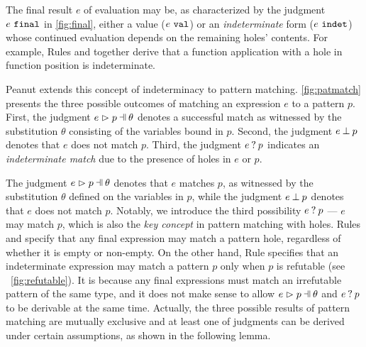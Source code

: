 The final result $e$ of evaluation may be, as characterized by the judgment $e ~\mathtt{final}$ in \autoref{fig:final}, either a value ($e ~\mathtt{val}$) or an \emph{indeterminate} form ($e ~\mathtt{indet}$) whose continued evaluation depends on the remaining holes' contents. For example, Rules \IAp and \IEHole together derive that a function application with a hole in function position is indeterminate.



Peanut extends this concept of indeterminacy to pattern matching.
\autoref{fig:patmatch} presents the three possible outcomes of matching an expression $e$ to a pattern $p$.
First, the judgment $\hpatmatch{e}{p}{\theta}$ denotes a successful match as witnessed by the substitution $\theta$ consisting of the variables bound in $p$. Second, the judgment $e \mathbin{\bot} p$ denotes that $e$ does not match $p$. Third, the judgment $e \mathbin{?} p$ indicates an \emph{indeterminate match} due to the presence of holes in $e$ or $p$.






The judgment $\hpatmatch{e}{p}{\theta}$ denotes that $e$ matches $p$, as witnessed by
the substitution $\theta$ defined on the variables in $p$, while the judgment
$e \mathbin{\bot} p$ denotes that $e$ does not match $p$. Notably, we introduce the
third possibility $e \mathbin{?} p$ --- $e$ may match $p$, which is also the
\textit{key concept}
in pattern matching with holes. Rules \MMEHole and \MMHole
specify that any final expression may match a pattern hole, regardless of
whether it is empty or non-empty. On the other hand, Rule \MMNotIntro specifies that
an indeterminate expression may match a pattern $p$ only when $p$ is refutable
(see \figurename~\ref{fig:refutable}).
It is because any final expressions
must match an irrefutable pattern of the same type, and it does not make sense to allow
$\hpatmatch{e}{p}{\theta}$ and $e \mathbin{?} p$ to be derivable at the same time.
Actually,
the three possible results of pattern matching are mutually exclusive and at
least one of judgments can be derived under certain assumptions, as shown in the
following lemma.

